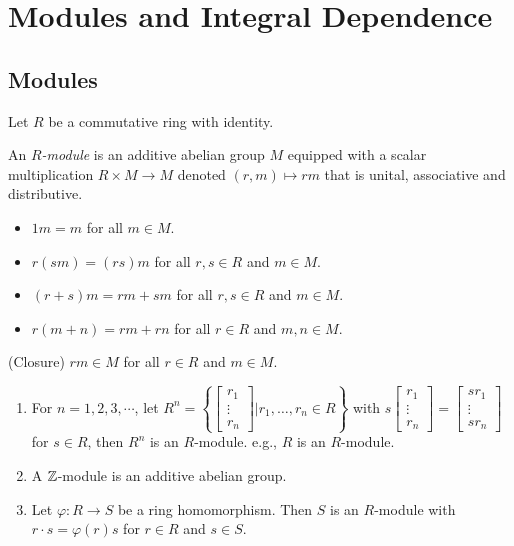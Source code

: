 \chapter{Modules and Integral Dependence}

\section*{Modules}

Let $R$ be a commutative ring with identity.

\begin{definition}\label{5.1}
    An \emph{$R$-module} is an additive abelian group $M$ equipped with a scalar multiplication $R \times M \to M$ denoted $(r,m) \mapsto rm$ that is unital, associative and distributive.
    \begin{itemize}
        \item $1m = m$ for all $m \in M$.
        \item $r(sm) = (rs)m$ for all $r,s \in R$ and $m \in M$.
        \item $(r+s)m = rm + sm$ for all $r,s \in R$ and $m \in M$.
        \item $r(m+n) = rm + rn$ for all $r \in R$ and $m,n \in M$.
    \end{itemize}
    \quad (Closure) $rm \in M$ for all $r \in R$ and $m \in M$. 
\end{definition}

\begin{example}\label{5.2}
    \begin{enumerate}
        \item 
            For $n = 1,2,3,\cdots$, let $R^{n} = \left\{\begin{bmatrix}r_1 \\ \vdots \\ r_n\end{bmatrix}\mathrel{\Bigg |} r_1,\ldots,r_n \in R\right\}$ with $s \begin{bmatrix}r_1 \\ \vdots \\ r_n\end{bmatrix} = \begin{bmatrix}sr_1 \\ \vdots \\ sr_n\end{bmatrix}$ for $s \in R$, then $R^{n}$ is an $R$-module. e.g., $R$ is an $R$-module.
        \item A $\mathbb{Z}$-module is an additive abelian group.
        \item Let $\varphi: R \to S$ be a ring homomorphism. Then $S$ is an $R$-module with $r \cdot s = \varphi(r)s$ for $r \in R$ and $s \in S$.
    \end{enumerate}
\end{example}

